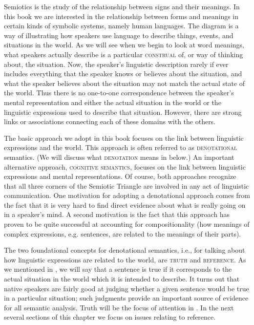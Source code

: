 Semiotics is the study of the relationship between signs and their meanings. In this book we are interested in the relationship between forms and meanings in certain kinds of symbolic systems, namely human languages. The diagram is a way of illustrating how speakers use language to describe things, events, and situations in the world. As we will see when we begin to look at word meanings, what speakers actually describe is a particular \textsc{construal} of, or way of thinking about, the situation. Now, the speaker’s linguistic description rarely if ever includes everything that the speaker knows or believes about the situation, and what the speaker believes about the situation may not match the actual state of the world. Thus there is no one-to-one correspondence between the speaker’s mental representation and either the actual situation in the world or the linguistic expressions used to describe that situation. However, there are strong links or associations connecting each of these domains with the others.



The basic approach we adopt in this book focuses on the link between linguistic expressions and the world. This approach is often referred to as \textsc{denotational} semantics. (We will discuss what \textsc{denotation} means in  below.) An important alternative approach, \textsc{cognitive semantics}, focuses on the link between linguistic expressions and mental representations. Of course, both approaches recognize that all three corners of the Semiotic Triangle are involved in any act of linguistic communication. One motivation for adopting a denotational approach comes from the fact that it is very hard to find direct evidence about what is really going on in a speaker’s mind. A second motivation is the fact that this approach has proven to be quite successful at accounting for compositionality (how meanings of complex expressions, e.g. sentences, are related to the meanings of their parts).



The two foundational concepts for denotational semantics, i.e., for talking about how linguistic expressions are related to the world, are \textsc{truth} and \textsc{reference}. As we mentioned in , we will say that a sentence is true if it corresponds to the actual situation in the world which it is intended to describe. It turns out that native speakers are fairly good at judging whether a given sentence would be true in a particular situation; such judgments provide an important source of evidence for all semantic analysis. Truth will be the focus of attention in . In the next several sections of this chapter we focus on issues relating to reference.


